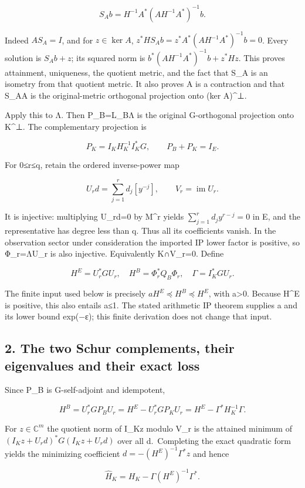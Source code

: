 \documentclass[11pt]{article}
\begin{document}
\[
S_Ab=H^{-1}A^*(AH^{-1}A^*)^{-1}b.
\]

Indeed \(AS_A=I\), and for \(z\in\ker A\), \(z^*HS_Ab=z^*A^*(AH^{-1}A^*)^{-1}b=0\). Every solution is \(S_Ab+z\); its squared norm is \(b^*(AH^{-1}A^*)^{-1}b+z^*Hz\). This proves attainment, uniqueness, the quotient metric, and the fact that S\_A is an isometry from that quotient metric. It also proves A is a contraction and that S\_AA is the original-metric orthogonal projection onto (ker A)\^{}⊥.

Apply this to Λ. Then P\_B=L\_BΛ is the original G-orthogonal projection onto K\^{}⊥. The complementary projection is

\[
P_K=I_KH_K^{-1}I_K^*G,\qquad P_B+P_K=I_E.
\]

For 0≤r≤q, retain the ordered inverse-power map

\[
U_rd=\sum_{j=1}^r d_j[y^{-j}],\qquad V_r=\operatorname{im}U_r.
\]

It is injective: multiplying U\_rd=0 by M\^{}r yields \(\sum_{j=1}^rd_jy^{r-j}=0\) in E, and the representative has degree less than q. Thus all its coefficients vanish. In the observation sector under consideration the imported IP lower factor is positive, so Φ\_r=ΛU\_r is also injective. Equivalently K∩V\_r=0. Define

\[
H^E=U_r^*GU_r,\quad H^B=\Phi_r^*Q_B\Phi_r,\quad
\Gamma=I_K^*GU_r.
\]

The finite input used below is precisely \(aH^E\preceq H^B\preceq H^E\), with a\textgreater0. Because H\^{}E is positive, this also entails a≤1. The stated arithmetic IP theorem supplies a and its lower bound exp(−ε); this finite derivation does not change that input.

\subsection{2. The two Schur complements, their eigenvalues and their exact loss}\label{the-two-schur-complements-their-eigenvalues-and-their-exact-loss}

Since P\_B is G-self-adjoint and idempotent,

\[
H^B=U_r^*GP_BU_r
=H^E-U_r^*GP_KU_r
=H^E-\Gamma^*H_K^{-1}\Gamma. \tag{F3}
\]

For \(z\in\mathbb C^m\) the quotient norm of I\_Kz modulo V\_r is the attained minimum of \((I_Kz+U_rd)^*G(I_Kz+U_rd)\) over all d.~Completing the exact quadratic form yields the minimizing coefficient \(d=-(H^E)^{-1}\Gamma^*z\) and hence

\[
\widehat H_K=H_K-\Gamma(H^E)^{-1}\Gamma^*. \tag{F4}
\]
\end{document}
